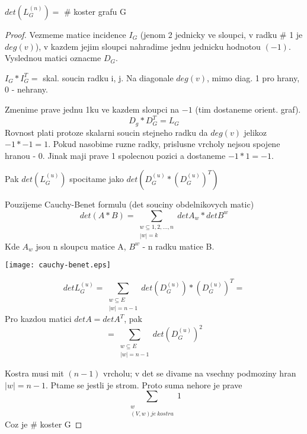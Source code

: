\begin{theorem}
	$ det(L^{(n)}_G) = $ \# koster grafu G
\end{theorem}
\begin{proof}
	Vezmeme matice incidence $ I_G $ (jenom 2 jednicky ve sloupci, v radku \# 1 je $deg(v)$), v kazdem jejim sloupci nahradime jednu jednicku hodnotou $(-1)$. Vyslednou matici oznacme $D_G$.

	$ I_G * I_G^T = $ skal. soucin radku i, j. Na diagonale $deg(v)$, mimo diag. 1 pro hrany, 0 - nehrany.

	Zmenime prave jednu 1ku ve kazdem sloupci na $-1$ (tim dostaneme orient. graf).
	\[ D_g * D_G^T = L_G \]
	Rovnost plati protoze skalarni soucin stejneho radku da $deg(v)$ jelikoz $ -1 * -1 = 1 $. Pokud nasobime ruzne radky, prislusne vrcholy nejsou spojene hranou - 0. Jinak maji prave 1 spolecnou pozici a dostaneme $-1 * 1 = -1$.

	Pak $det(L^{(u)}_G)$ spocitame jako $det(D^{(u)}_G * (D^{(u)}_G)^T)$

	Pouzijeme Cauchy-Benet formulu (det souciny obdelnikovych matic)
	\[ det(A*B) = \sum _{\substack{ w \subseteq {1,2, ..., n} \\ |w| = k}} det A_w * det B^w \]
	Kde $ A_w $ jsou n sloupcu matice A, $ B^w $ - n radku matice B.

	\texttt{[image: cauchy-benet.eps]}

	\[ det L^{(u)}_G = \sum_{\substack{w \subseteq E \\ |w| = n-1}} det(D^{(u)}_G) * (D^{(u)}_G)^{T} = \]
	Pro kazdou matici $ det A = det A^T $, pak
	\[ = \sum_{\substack{w \subseteq E \\ |w| = n-1}} det(D^{(u)}_G)^2 \]

	Kostra musi mit $(n-1)$ vrcholu; v det se divame na vsechny podmoziny hran $|w| = n - 1$.
	Ptame se jestli je strom. Proto suma nehore je prave
	\[ \sum_{\substack{w \\ (V,w) je \ kostra}} 1 \]
	Coz je \# koster G


\end{proof}
